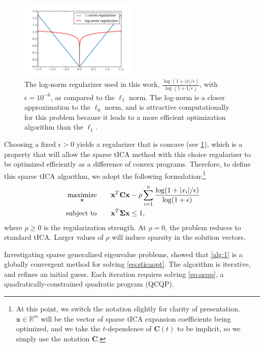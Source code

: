 \documentclass[aip, jcp, reprint, nolinenumbers, twocolumn, nobalancelastpage, nofootinbib]{revtex4-1}
\begin{document}
\begin{figure}
    \centering
    \includegraphics[width=0.5\textwidth]{regularizer.pdf}
    \caption{\label{fig:1} The log-norm regularizer used in this work, $\frac{\log(1+|x|/\epsilon)}{\log(1+1/\epsilon)}$, with $\epsilon=10^{-6}$, as compared to the $\ell_1$ norm. The log-norm is a closer approximation to the $\ell_0$ norm, and is attractive computationally for this problem because it leads to a more efficient optimization algorithm than the $\ell_1$.}
\end{figure}

Choosing a fixed $\epsilon>0$ yields a regularizer that is concave (see \cref{fig:1}), which is a property that will allow the sparse tICA method with this choice regularizer to be optimized efficiently as a difference of convex programs.\cite{horst1999dc} Therefore, to define this sparse tICA algorithm, we adopt the following formulation:\footnote{At this point, we switch the notation slightly for clarity of presentation. $\mathbf{x} \in \mathbb{R}^m$ will be the vector of sparse tICA expansion coefficients being optimized, and we take the $t$-dependence of $\mathbf{C}(t)$ to be implicit, so we simply use the notation $\mathbf{C}$.}
\begin{align}
\label{eq:sticaopt}
\begin{split}
\operatornamewithlimits{maximize}_\mathbf{x} \hspace{2em}& \mathbf{x}^T \mathbf{C} \mathbf{x} - \rho \sum_{i=1}^n \frac{\log(1+|x_i|/\epsilon)}{\log(1+\epsilon)} \\
\text{ subject to} \hspace{2em}& \mathbf{x}^T \mathbf{\Sigma} \mathbf{x} \leq 1,
\end{split}
\end{align}
where $\rho\geq0$ is the regularization strength. At $\rho=0$, the problem reduces to standard tICA. Larger values of $\rho$ will induce sparsity in the solution vectors.

Investigating sparse generalized eigenvalue problems, \citet{sriperumbudur2011majorization} showed that \cref{alg:1} is a globally convergent method for solving \cref{eq:sticaopt}. The algorithm is iterative, and refines an initial guess. Each iteration requires solving \cref{eq:qcqp}, a quadratically-constrained quadratic program (QCQP).
\end{document}
